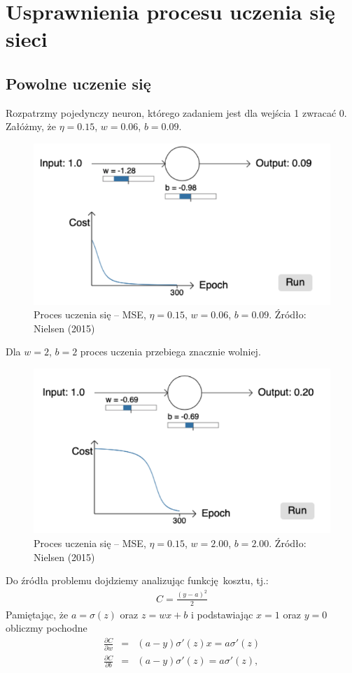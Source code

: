 \documentclass[10pt, oneside]{article}
\theoremstyle{remark}
\begin{document}
\section{Usprawnienia procesu uczenia się sieci}

\subsection{Powolne uczenie się}

Rozpatrzmy pojedynczy neuron, którego zadaniem jest dla wejścia 1 zwracać 0.
Załóżmy, że $\eta = 0.15$, $w=0.06$, $b=0.09$.
\begin{figure}[!htpb]
	\centering
	\includegraphics[width=.5\linewidth]{figures/learn_mse_0609}
	\caption{Proces uczenia się -- MSE, $\eta = 0.15$, $w=0.06$, $b=0.09$. Źródło: Nielsen (2015)}
\end{figure}
Dla $w=2$, $b=2$ proces uczenia przebiega znacznie wolniej.
\begin{figure}[!htpb]
	\centering
	\includegraphics[width=.5\linewidth]{figures/learn_mse_2020}
	\caption{Proces uczenia się -- MSE, $\eta = 0.15$, $w=2.00$, $b=2.00$. Źródło: Nielsen (2015)}
\end{figure}
Do źródła problemu dojdziemy analizując funkcję kosztu, tj.:
\begin{eqnarray}
  C = \frac{(y-a)^2}{2}
\end{eqnarray}
Pamiętając, że $a = \sigma(z)$ oraz $z = wx +b$ i podstawiając $x=1$ oraz $y=0$ obliczmy pochodne
\begin{eqnarray} 
  \frac{\partial C}{\partial w} & = & (a-y)\sigma'(z) x = a \sigma'(z) \\
  \frac{\partial C}{\partial b} & = & (a-y)\sigma'(z) = a \sigma'(z),
\end{eqnarray}
\end{document}
